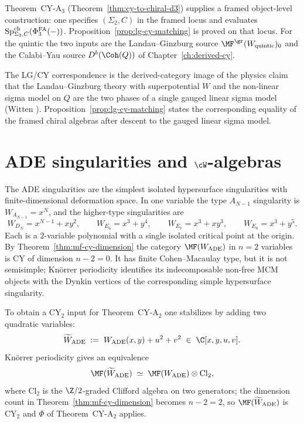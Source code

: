 \begin{remark}[Framed \texorpdfstring{$d = 3$}{d = 3} construction]
\label{rem:mf-d3-conditional}
Theorem~CY-A$_3$ (Theorem~\ref{thm:cy-to-chiral-d3}) supplies a framed object-level construction: one specifies $(\Sigma_2,C)$ in the framed locus and evaluates $\mathrm{Sp}^{\mathrm{ch}}_{\Sigma_2,C}(\Phi^{\mathrm{FA}}_3(-))$. Proposition~\ref{prop:lg-cy-matching} is proved on that locus. For the quintic the two inputs are the Landau--Ginzburg source $\MF^{\gr}(W_{\mathrm{quintic}})_0$ and the Calabi--Yau source $D^b(\Coh(Q))$ of Chapter~\ref{ch:derived-cy}.
\end{remark}

The LG/CY correspondence is the derived-category image of the physics claim that the Landau--Ginzburg theory with superpotential $W$ and the non-linear sigma model on $Q$ are the two phases of a single gauged linear sigma model (Witten \cite{Witten1993}). Proposition~\ref{prop:lg-cy-matching} states the corresponding equality of the framed chiral algebras after descent to the gauged linear sigma model.

\section{ADE singularities and \texorpdfstring{$\cW$}{W}-algebras}
\label{sec:ade-w-algebras}

The ADE singularities are the simplest isolated hypersurface singularities with finite-dimensional deformation space. In one variable the type $A_{N-1}$ singularity is $W_{A_{N-1}} = x^N$, and the higher-type singularities are
\[
 W_{D_N} = x^{N-1} + xy^2, \qquad
 W_{E_6} = x^3 + y^4, \qquad
 W_{E_7} = x^3 + xy^3, \qquad
 W_{E_8} = x^3 + y^5 .
\]
Each is a $2$-variable polynomial with a single isolated critical point at the origin. By Theorem~\ref{thm:mf-cy-dimension} the category $\MF(W_{\mathrm{ADE}})$ in $n = 2$ variables is CY of dimension $n - 2 = 0$. It has finite Cohen--Macaulay type, but it is not semisimple; Kn\"orrer periodicity \cite{Knorrer1987,BuchweitzGreuelSchreyer1987} identifies its indecomposable non-free MCM objects with the Dynkin vertices of the corresponding simple hypersurface singularity.

To obtain a CY$_2$ input for Theorem~CY-A$_2$ one stabilizes by adding two quadratic variables:
\[
 \widetilde{W}_{\mathrm{ADE}} \;:=\; W_{\mathrm{ADE}}(x, y) + u^2 + v^2 \;\in\; \C[x, y, u, v] .
\]
Kn\"orrer periodicity \cite{Knorrer1987} gives an equivalence
\[
 \MF(\widetilde{W}_{\mathrm{ADE}}) \;\simeq\; \MF(W_{\mathrm{ADE}}) \otimes \mathrm{Cl}_2 ,
\]
where $\mathrm{Cl}_2$ is the $\Z/2$-graded Clifford algebra on two generators; the dimension count in Theorem~\ref{thm:mf-cy-dimension} becomes $n - 2 = 2$, so $\MF(\widetilde{W}_{\mathrm{ADE}})$ is CY$_2$ and $\Phi$ of Theorem~CY-A$_2$ applies.

